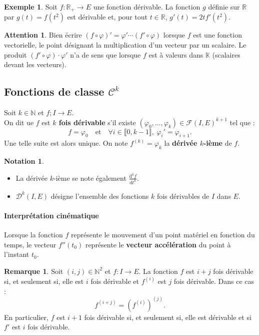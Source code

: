 \documentclass[french]{article}
\newcommand{\N}{\mathbb{N}}
\newcommand{\R}{\mathbb{R}}
\newcommand{\K}{\mathbb{K}}
\renewcommand{\d}{\text{d}}
\theoremstyle{plain}
\theoremstyle{definition}
\newtheorem*{ex}{Exemple}
\newtheorem*{rmq}{Remarque}
\newtheorem*{notation}{Notation}
\newtheorem*{attention}{Attention}
\theoremstyle{remark}
\begin{document}
\begin{ex}
	Soit $f:\R_+\to E$ une fonction dérivable. La fonction $g$ définie sur $\R$ par $g(t)=f(t^2)$ est dérivable et, pour tout $t\in\R$, $g'(t)=2tf'(t^2)$.
\end{ex}

\begin{attention}
	Bien écrire $(f\circ\varphi)'=\varphi'\cdots(f'\circ\varphi)$ lorsque $f$ est une fonction vectorielle, le point désignant la multiplication d'un vecteur par un scalaire. Le produit $(f'\circ\varphi)\cdot\varphi'$ n'a de sens que lorsque $f$ est à valeurs dans $\K$ (scalaires devant les vecteurs).
\end{attention}

\subsection{Fonctions de classe $\mathcal{C}^k$}

\begin{dfn}
	Soit $k\in\N$ et $f;I\to E$.\\
	On dit ue $f$ est \textbf{$k$ fois dérivable} s'il existe $(\varphi_0,\ldots,\varphi_k)\in\mathcal{F}(I,E)^{k+1}$ tel que :
	$$f=\varphi_0\quad\text{et}\quad\forall i\in\llbracket0,k-1\rrbracket,\ \varphi_i'=\varphi_{i+1}.$$
	Une telle suite est alors unique. On note $f^{(k)}=\varphi_k$ la \textbf{dérivée $k$-ième} de $f$.
\end{dfn}

\begin{notation}
	\begin{itemize}
		\item La dérivée $k$-ième se note également $\displaystyle\frac{\d^kf}{\d t^k}$.
		\item $\mathcal{D}^k(I,E)$ désigne l'ensemble des fonctions $k$ fois dérivables de $I$ dans $E$.
	\end{itemize}
\end{notation}

\paragraph{Interprétation cinématique}
Lorsque la fonction $f$ représente le mouvement d'un point matériel en fonction du temps, le vecteur $f''(t_0)$ représente le \textbf{vecteur accélération} du point à l'instant $t_0$.

\begin{rmq}
	Soit $(i,j)\in\N^2$ et $f:I\to E$. La fonction $f$ est $i+j$ fois dérivable si, et seulement si, elle est $i$ fois dérivable et $f^{(i)}$ est $j$ fois dérivable. Dans ce cas :
	$$f^{(i+j)}=(f^{(i)})^{(j)}.$$
	En particulier, $f$ est $i+1$ fois dérivable si, et seulement si, elle est dérivable et si $f'$ est $i$ fois dérivable.
\end{rmq}
\end{document}
